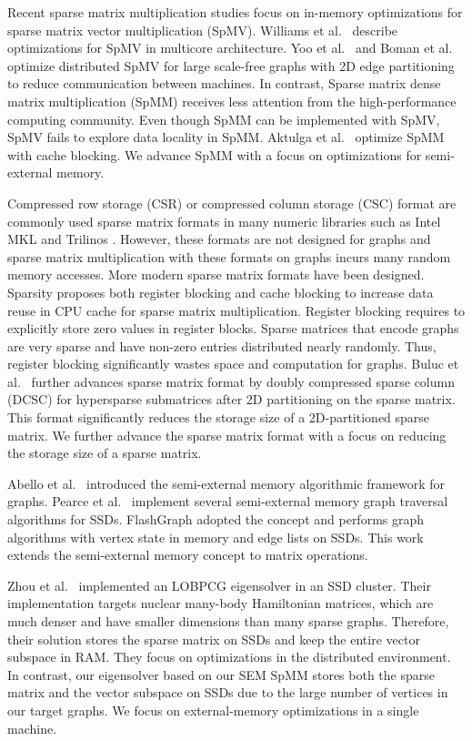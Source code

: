 Recent sparse matrix multiplication studies focus on in-memory optimizations
for sparse matrix vector multiplication (SpMV). Williams et al.~\cite{Williams07}
describe optimizations for SpMV in multicore architecture. Yoo et al.~\cite{Yoo11}
and Boman et al.~\cite{Boman2013} optimize distributed SpMV for large
scale-free graphs with 2D edge partitioning to reduce communication between
machines. In contrast, Sparse matrix dense matrix multiplication (SpMM) receives
less attention from the high-performance computing community. Even though
SpMM can be implemented with SpMV, SpMV fails to explore data locality in SpMM.
Aktulga et al.~\cite{Aktulga14} optimize SpMM with cache blocking. We advance
SpMM with a focus on optimizations for semi-external memory.

Compressed row storage (CSR) or compressed column storage (CSC) format are commonly
used sparse matrix formats in many numeric libraries such as Intel MKL \cite{mkl}
and Trilinos \cite{trilinos}. However, these formats are not designed for graphs
and sparse matrix multiplication with these formats on graphs incurs many random
memory accesses.
More modern sparse matrix formats have been designed.
Sparsity \cite{Im04} proposes both register blocking and cache blocking to
increase data reuse in CPU cache for sparse matrix multiplication. Register blocking
requires to explicitly store zero values in register blocks. Sparse matrices
that encode graphs are very sparse and have non-zero entries distributed nearly
randomly. Thus, register blocking significantly wastes space and computation
for graphs. Buluc et al.~\cite{Buluc08} further advances sparse matrix format
by doubly compressed sparse column (DCSC) for hypersparse submatrices after 2D
partitioning on the sparse matrix. This format significantly reduces the storage
size of a 2D-partitioned sparse matrix. We further advance the sparse matrix
format with a focus on reducing the storage size of a sparse matrix.

Abello et al.~\cite{Abello98} introduced the semi-external memory algorithmic
framework for graphs. Pearce et al.~\cite{Pearce10} implement several 
semi-external memory graph traversal algorithms for SSDs. FlashGraph
\cite{flashgraph} adopted the concept and performs graph algorithms with
vertex state in memory and edge lists on SSDs. This work extends the semi-external
memory concept to matrix operations.

Zhou et al.~\cite{Zhou12} implemented an LOBPCG \cite{Arbenz05} eigensolver in
an SSD cluster. Their implementation targets nuclear many-body Hamiltonian
matrices, which are much denser and have smaller dimensions than many sparse
graphs. Therefore, their solution stores the sparse matrix on SSDs and keep
the entire vector subspace in RAM. They focus on optimizations
in the distributed environment. In contrast, our eigensolver based on our
SEM SpMM stores both
the sparse matrix and the vector subspace on SSDs due to the large number
of vertices in our target graphs. We focus on external-memory optimizations
in a single machine.

